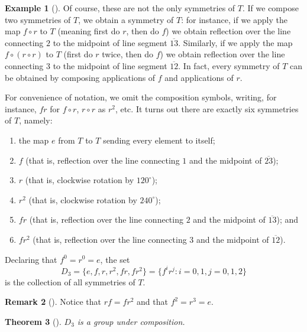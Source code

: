 \documentclass[10pt,openany,oneside]{book}
\theoremstyle{plain}
\newtheorem{theorem}{Theorem}[section]
\theoremstyle{definition}
\theoremstyle{definition}
\newtheorem{remark}[theorem]{Remark}
\theoremstyle{definition}
\newtheorem{example}[theorem]{Example}
\theoremstyle{definition}
\numberwithin{equation}{section}
\begin{document}
\begin{example}[]
\par
Of course, these are not the only symmetries of \(T\). If we compose two symmetries of \(T\), we obtain a symmetry of \(T\): for instance, if we apply the map \(f\circ r\) to \(T\) (meaning first do \(r\), then do \(f\)) we obtain reflection over the line connecting \(2\) to the midpoint of line segment \(\overline{13}\). Similarly, if we apply the map \(f\circ (r\circ r)\) to \(T\) (first do \(r\) twice, then do \(f\)) we obtain reflection over the line connecting \(3\) to the midpoint of line segment \(\overline{12}\). In fact, every symmetry of \(T\) can be obtained by composing applications of \(f\) and applications of \(r\).%
\par
For convenience of notation, we omit the composition symbols, writing, for instance, \(fr\) for \(f\circ r\), \(r\circ r\) as \(r^2\), etc. It turns out there are exactly six symmetries of \(T\), namely: \leavevmode%
\begin{enumerate}
\item\hypertarget{li-344}{}the map \(e\) from \(T\) to \(T\) sending every element to itself;%
\item\hypertarget{li-345}{}\(f\) (that is, reflection over the line connecting \(1\) and the midpoint of \(\overline{23}\));%
\item\hypertarget{li-346}{}\(r\) (that is, clockwise rotation by \(120^{\circ}\));%
\item\hypertarget{li-347}{}\(r^2\) (that is, clockwise rotation by \(240^{\circ}\));%
\item\hypertarget{li-348}{}\(fr\) (that is, reflection over the line connecting \(2\) and the midpoint of \(\overline{13}\)); and%
\item\hypertarget{li-349}{}\(fr^2\) (that is, reflection over the line connecting \(3\) and the midpoint of \(\overline{12}\)).%
\end{enumerate}
%
\par
Declaring that \(f^0=r^0=e\), the set%
\begin{equation*}
D_3=\{e, f, r, r^2, fr, fr^2\}=\{f^ir^j:i=0,1, j=0,1,2\}
\end{equation*}
is the collection of all symmetries of \(T\).%
\end{example}
\begin{remark}[]\label{remark-32}
Notice that \(rf=fr^2\) and that \(f^2=r^3=e\).%
\end{remark}
\begin{theorem}[{}]\label{di3}
\(D_3\) is a group under composition.%
\end{theorem}
\end{document}
